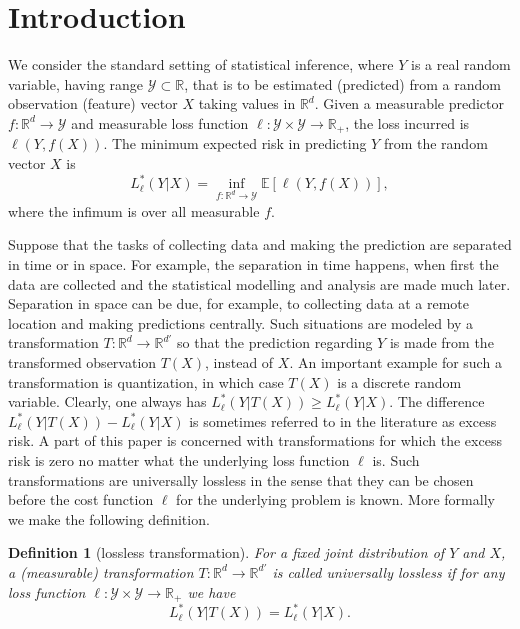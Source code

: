 \documentclass[11pt]{article}
\newtheorem{defin}{Definition}
\def\R{{\mathbb R}}
\def\Y{\mathcal{Y}}
\def\EXP {{\mathbb E}}
\begin{document}





\section{Introduction}

\label{sec-int}

We consider the standard setting of statistical inference, where $Y$ is a real random variable, having range $\Y\subset \R$, that is to be estimated (predicted) from a random observation (feature) vector $X$  taking values in $\R^d$. Given a measurable predictor $f:\R^d \to \Y$ and measurable  loss function $\ell: \Y\times \Y\to \R_+$, the loss incurred is  $\ell(Y,f(X))$. The minimum expected risk in predicting $Y$ from the random vector $X$  is
\[
 L_\ell^*(Y|X) = \inf_{f:\R^d\to \Y} \EXP[\ell(Y,f(X))],
\]
where the infimum is over all measurable $f$.

Suppose  that the tasks of collecting data and making the prediction are separated in time or in space. For example, the separation in time happens, when first the data are collected and  the statistical modelling and analysis are made much later. Separation in space can be due, for example, to collecting data at a remote location and making predictions centrally. Such situations are modeled by a transformation $T:\R^d \to \R^{d'}$ so that the prediction regarding $Y$ is made from the transformed observation $T(X)$, instead of $X$. An important example for such a transformation is quantization, in which case $T(X)$ is a discrete random variable.  Clearly, one always has $L_\ell^*(Y|T(X)) \ge  L_\ell^*(Y|X)$. The difference $L_\ell^*(Y|T(X)) - L_\ell^*(Y|X)$ is sometimes referred to in the literature as excess risk. A part of this paper is concerned with transformations for which the excess risk is zero no matter what the underlying loss function $\ell$ is. Such transformations are universally lossless in the sense that they can be chosen before the cost function $\ell$ for the underlying problem is known. More formally we make the following definition. 


\begin{defin}[lossless transformation]
  \label{def1}
For a fixed joint distribution of $Y$ and $X$, a (measurable) transformation $T:\R^d\to
\R^{d'}$  is called \emph{universally lossless} if for any loss
function  $\ell: \Y\times \Y\to \R_+$ we have 
\[
L_\ell^*(Y|T(X)) = L_\ell^*(Y|X).
\]
\end{defin}
\end{document}
